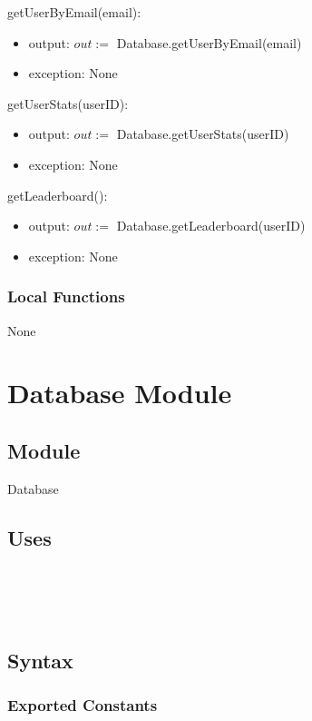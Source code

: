 \documentclass[12pt, titlepage]{article}
\begin{document}
\noindent getUserByEmail(email):
\begin{itemize}
\item output:  $out := $ Database.getUserByEmail(email)
\item exception: None
\end{itemize}

\noindent getUserStats(userID):
\begin{itemize}
\item output:  $out := $ Database.getUserStats(userID)
\item exception: None
\end{itemize}


\noindent getLeaderboard():
\begin{itemize}
\item output:  $out := $ Database.getLeaderboard(userID)
\item exception: None
\end{itemize}


\subsubsection{Local Functions}
None

\newpage
\section{Database Module} \label{Database} 

\subsection{Module}

Database

\subsection{Uses}

\\
\\
\\

\subsection{Syntax}

\subsubsection{Exported Constants}
\end{document}

